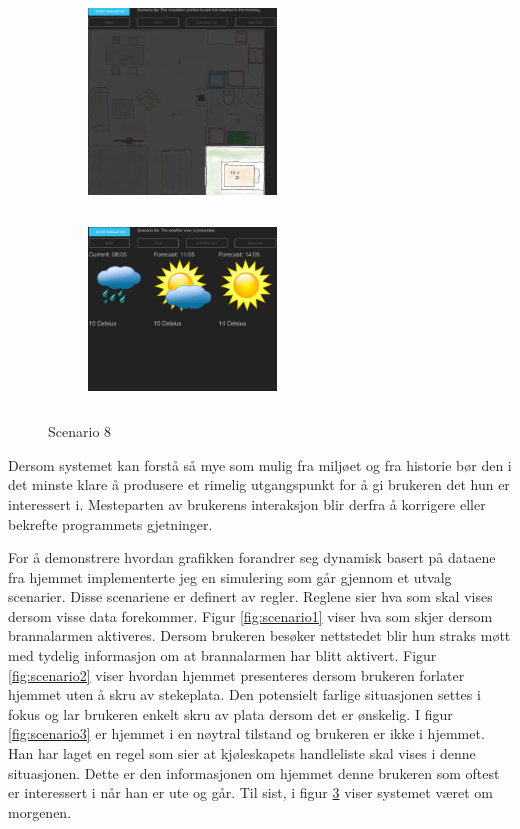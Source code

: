 \begin{figure}[ht]
\centering
\begin{subfigure}{0.32\textwidth}
\includegraphics[width=5cm, height=5cm]{fig/scenario8a}
\caption{}
\label{fig:8a}
\end{subfigure}
\begin{subfigure}{0.32\textwidth}
\includegraphics[width=5cm, height=5cm]{fig/scenario8b}
\caption{}
\label{fig:8b}
\end{subfigure}
\caption{Scenario 8}
\label{fig:scenario8}
\end{figure}
Dersom systemet kan forstå så mye som mulig fra miljøet og fra historie bør den i det minste klare å produsere et rimelig utgangspunkt for å gi brukeren det hun er interessert i. Mesteparten av brukerens interaksjon blir derfra å korrigere eller bekrefte programmets gjetninger.

For å demonstrere hvordan grafikken forandrer seg dynamisk basert på dataene fra hjemmet implementerte jeg en simulering som går gjennom et utvalg scenarier. Disse scenariene er definert av regler. Reglene sier hva som skal vises dersom visse data forekommer. Figur \ref{fig:scenario1} viser hva som skjer dersom brannalarmen aktiveres. Dersom brukeren besøker nettstedet blir hun straks møtt med tydelig informasjon om at brannalarmen har blitt aktivert. Figur \ref{fig:scenario2} viser hvordan hjemmet presenteres dersom brukeren forlater hjemmet uten å skru av stekeplata. Den potensielt farlige situasjonen settes i fokus og lar brukeren enkelt skru av plata dersom det er ønskelig. I figur \ref{fig:scenario3} er hjemmet i en nøytral tilstand og brukeren er ikke i hjemmet. Han har laget en regel som sier at kjøleskapets handleliste skal vises i denne situasjonen. Dette er den informasjonen om hjemmet denne brukeren som oftest er interessert i når han er ute og går. Til sist, i figur \ref{fig:scenario8} viser systemet været om morgenen.\\

